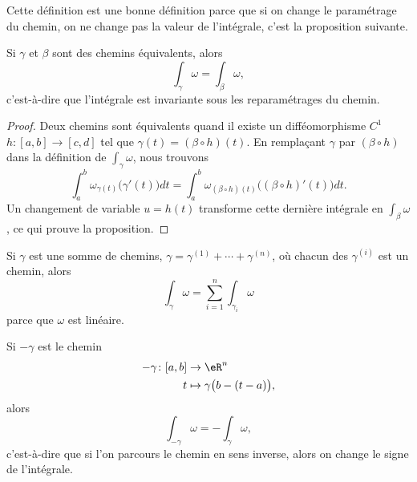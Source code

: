 Cette définition est une bonne définition parce que si on change le paramétrage du chemin, on ne change pas la valeur de l'intégrale, c'est la proposition suivante.
\begin{proposition}
	Si \( \gamma\) et \( \beta\) sont des chemins équivalents, alors
	\begin{equation}
		\int_{\gamma}\omega=\int_{\beta}\omega,
	\end{equation}
	c'est-à-dire que l'intégrale est invariante sous les reparamétrages du chemin.
\end{proposition}
\begin{proof}
	Deux chemins sont équivalents quand il existe un difféomorphisme \( C^1\) \( h\colon [a,b]\to [c,d]\) tel que \( \gamma(t)=(\beta\circ h)(t)\). En remplaçant \( \gamma\) par \( (\beta\circ h)\) dans la définition de \( \int_{\gamma}\omega\), nous trouvons
	\begin{equation}
		\int_a^b\omega_{\gamma(t)}\big( \gamma'(t) \big)dt=\int_a^b\omega_{(\beta\circ h)(t)}\big( (\beta\circ h)'(t) \big)dt.
	\end{equation}
	Un changement de variable \( u=h(t)\) transforme cette dernière intégrale en \( \int_{\beta}\omega\), ce qui prouve la proposition.
\end{proof}

\begin{remark}
	Si \( \gamma\) est une somme de chemins, \( \gamma=\gamma^{(1)}+\cdots+\gamma^{(n)}\), où chacun des \( \gamma^{(i)}\) est un chemin, alors
	\begin{equation}
		\int_{\gamma}\omega=\sum_{i=1}^n\int_{\gamma_i}\omega
	\end{equation}
	parce que \( \omega\) est linéaire.
\end{remark}

\begin{remark}
	Si \( -\gamma\) est le chemin
	\begin{equation}
		\begin{aligned}
			- \gamma\colon [a,b] & \to \eR^n                          \\
			t                    & \mapsto \gamma\big( b-(t-a) \big),
		\end{aligned}
	\end{equation}
	alors
	\begin{equation}
		\int_{-\gamma}\omega=-\int_{\gamma}\omega,
	\end{equation}
	c'est-à-dire que si l'on parcours le chemin en sens inverse, alors on change le signe de l'intégrale.
\end{remark}


